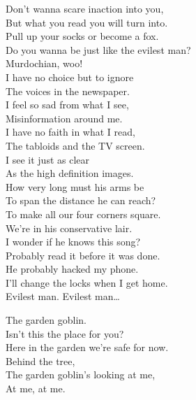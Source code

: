 Don't wanna scare inaction into you, \\
But what you read you will turn into. \\
Pull up your socks or become a fox. \\
Do you wanna be just like the evilest man? \\
Murdochian, woo! \\

I have no choice but to ignore \\
The voices in the newspaper. \\
I feel so sad from what I see, \\
Misinformation around me. \\

I have no faith in what I read, \\
The tabloids and the TV screen. \\
I see it just as clear \\
As the high definition images. \\

How very long must his arms be \\
To span the distance he can reach? \\
To make all our four corners square. \\
We're in his conservative lair. \\

I wonder if he knows this song? \\
Probably read it before it was done. \\
He probably hacked my phone. \\
I'll change the locks when I get home. \\

Evilest man. Evilest man… \\





The garden goblin. \\

Isn't this the place for you? \\
Here in the garden we're safe for now. \\
Behind the tree, \\
The garden goblin's looking at me, \\
At me, at me. \\

